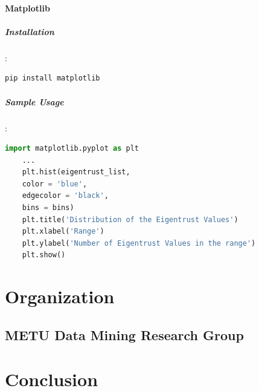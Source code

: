 \documentclass[12pt]{article}
\begin{document}
	\paragraph{Matplotlib}
	\subparagraph{Installation}:
	\begin{lstlisting}[language=bash]
	pip install matplotlib
	\end{lstlisting}
	
	\subparagraph{Sample Usage}:
	\begin{lstlisting}[language=python, caption=Matplotlib example]
	import matplotlib.pyplot as plt
	...
	plt.hist(eigentrust_list, 
	color = 'blue', 
	edgecolor = 'black',
	bins = bins)
	plt.title('Distribution of the Eigentrust Values')
	plt.xlabel('Range')
	plt.ylabel('Number of Eigentrust Values in the range')
	plt.show() 
	\end{lstlisting}
	
	\section{Organization}
	\subsection{METU Data Mining Research Group}
	
	\section{Conclusion}
	
	
	
	
	
\end{document}
